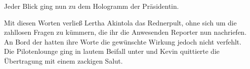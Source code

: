 \par

Jeder Blick ging nun zu dem Hologramm der Präsidentin. 

\par

Mit diesen Worten verließ Lertha Akintola das Rednerpult, ohne sich um die zahllosen Fragen zu kümmern, die ihr die Anwesenden Reporter nun nachriefen. An Bord der  hatten ihre Worte die gewünschte Wirkung jedoch nicht verfehlt. Die Pilotenlounge ging in lautem Beifall unter und Kevin quittierte die Übertragung mit einem zackigen Salut.